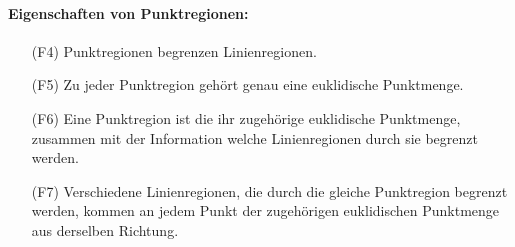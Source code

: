         \paragraph{Eigenschaften von Punktregionen:}
        \begin{itemize}
            \item[(F4)] Punktregionen begrenzen Linienregionen.
            \item[(F5)] Zu jeder Punktregion gehört genau eine euklidische Punktmenge.
            \item[(F6)] Eine Punktregion ist die ihr zugehörige euklidische Punktmenge, zusammen mit der Information welche Linienregionen durch sie begrenzt werden.
            \item[(F7)] Verschiedene Linienregionen, die durch die gleiche Punktregion begrenzt werden, kommen an jedem Punkt der zugehörigen euklidischen Punktmenge aus derselben Richtung.
        \end{itemize}

% 	
% 	


